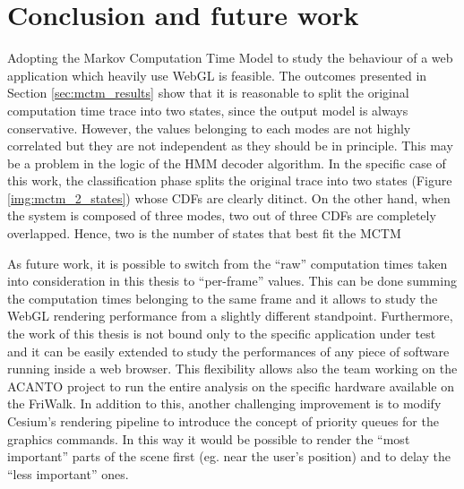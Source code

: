 \chapter{Conclusion and future work} \label{cha:conclusion}


Adopting the Markov Computation Time Model to study the behaviour of a web
application which heavily use WebGL is feasible.
The outcomes presented in Section \ref{sec:mctm_results} show that it is
reasonable to split the original computation time trace into two states, since
the output model is always conservative.
However, the values belonging to each modes are not highly correlated but they
are not independent as they should be in principle.
This may be a problem in the logic of the HMM decoder algorithm. In the specific
case of this work, the classification phase splits the original trace into two
states (Figure \ref{img:mctm_2_states}) whose CDFs are clearly ditinct. On the
other hand, when the system is composed of three modes, two out of three CDFs
are completely overlapped. Hence, two is the number of states that best fit the
MCTM

As future work, it is possible to switch from the ``raw'' computation times taken
into consideration in this thesis to ``per-frame'' values. This can be done
summing the computation times belonging to the same frame and it allows to study
the WebGL rendering performance from a slightly different standpoint.
Furthermore, the work of this thesis is not bound only to the specific
application under test and it can be easily extended to study the performances
of any piece of software running inside a web browser. This flexibility allows
also the team working on the ACANTO project to run the entire analysis on the
specific hardware available on the FriWalk. In addition to this, another
challenging improvement is to modify Cesium's rendering pipeline to introduce
the concept of priority queues for the graphics commands. In this way it would
be possible to render the ``most important'' parts of the scene first (eg. near
the user's position) and to delay the ``less important'' ones.
